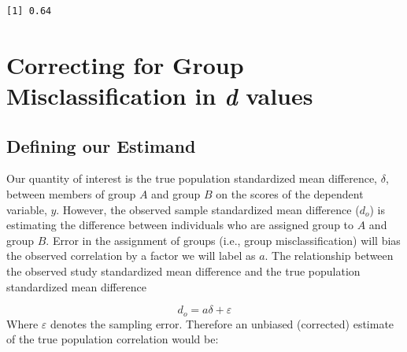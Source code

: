 \documentclass[
  letterpaper,
  DIV=11,
  numbers=noendperiod]{scrreprt}
\newenvironment{Shaded}{\begin{snugshade}}{\end{snugshade}}
\newcommand{\DecValTok}[1]{\textcolor[rgb]{0.68,0.00,0.00}{#1}}
\newcommand{\DocumentationTok}[1]{\textcolor[rgb]{0.37,0.37,0.37}{\textit{#1}}}
\newcommand{\FunctionTok}[1]{\textcolor[rgb]{0.28,0.35,0.67}{#1}}
\newcommand{\NormalTok}[1]{\textcolor[rgb]{0.00,0.23,0.31}{#1}}
\newcommand{\OtherTok}[1]{\textcolor[rgb]{0.00,0.23,0.31}{#1}}
\newcommand{\SpecialCharTok}[1]{\textcolor[rgb]{0.37,0.37,0.37}{#1}}
\begin{document}
\begin{Shaded}
\end{Shaded}

\begin{verbatim}
[1] 0.64
\end{verbatim}

\hypertarget{correcting-for-group-misclassification-in-d-values}{%
\section{\texorpdfstring{Correcting for Group Misclassification in
\emph{d}
values}{Correcting for Group Misclassification in d values}}\label{correcting-for-group-misclassification-in-d-values}}

\hypertarget{defining-our-estimand-2}{%
\subsection{Defining our Estimand}\label{defining-our-estimand-2}}

Our quantity of interest is the true population standardized mean
difference, \(\delta\), between members of group \(A\) and group \(B\)
on the scores of the dependent variable, \(y\). However, the observed
sample standardized mean difference (\(d_o\)) is estimating the
difference between individuals who are assigned group to \(A\) and group
\(B\). Error in the assignment of groups (i.e., group misclassification)
will bias the observed correlation by a factor we will label as \(a\).
The relationship between the observed study standardized mean difference
and the true population standardized mean difference

\[
d_o = a\delta + \varepsilon
\] Where \(\varepsilon\) denotes the sampling error. Therefore an
unbiased (corrected) estimate of the true population correlation would
be:
\end{document}
